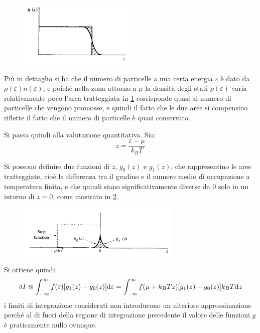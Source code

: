 \begin{figure}[b]
	\centering
	\includegraphics[width=0.5\textwidth]{Immagini/SmoothStep.png}
	\caption{}
	\label{fig:stepsmooth}
\end{figure}

Più in dettaglio si ha che il numero di particelle a una certa energia $\varepsilon$ è dato da $\rho(\varepsilon)\bar{n}(\varepsilon)$, e poiché nella zona attorno a $\mu$ la densità degli stati $\rho(\varepsilon)$ varia relativamente poco l'area tratteggiata in \cref{fig:stepsmooth} corrisponde quasi al numero di particelle che vengono promosse, e quindi il fatto che le due aree si compensino riflette il fatto che il numero di particelle è quasi conservato.
\newline

Si passa quindi alla valutazione quantitativa. Sia:
\begin{equation*}
	z = \frac{\varepsilon - \mu}{k_B T}
\end{equation*}

Si possono definire due funzioni di $z$, $g_0(z)$ e $g_1(z)$, che rappresentino le aree tratteggiate, cioè la differenza tra il gradino e il numero medio di occupazione a temperatura finita, e che quindi siano significativamente diverse da $0$ solo in un intorno di $z=0$, come mostrato in \cref{fig:stepdiffunc}.

\begin{figure}[t]
	\centering
	\includegraphics[width=0.7\textwidth]{Immagini/SmoothStepDifferences.png}
	\caption{}
	\label{fig:stepdiffunc}
\end{figure}

Si ottiene quindi:
\begin{equation*}
\delta I \approxeq \int_{-\infty}^{\infty} f(\varepsilon)[g_1(z) - g_0(z)] \dd \varepsilon = \int_{-\infty}^{\infty} f(\mu + k_B T z)[g_1(z) - g_0(z)] k_B T \dd z
\end{equation*}
i limiti di integrazione considerati non introducono un ulteriore approssimazione perché al di fuori della regione di integrazione precedente il valore delle funzioni $g$ è praticamente nullo ovunque.

